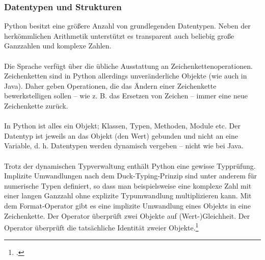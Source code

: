 \subsubsection{Datentypen und Strukturen}
Python besitzt eine größere Anzahl von grundlegenden Datentypen. Neben der herkömmlichen Arithmetik unterstützt es transparent auch beliebig große Ganzzahlen und komplexe Zahlen.\\
\\
Die Sprache verfügt über die übliche Ausstattung an Zeichenkettenoperationen. Zeichenketten sind in Python allerdings unveränderliche Objekte (wie auch in Java). Daher geben Operationen, die das Ändern einer Zeichenkette bewerkstelligen sollen – wie z. B. das Ersetzen von Zeichen – immer eine neue Zeichenkette zurück.\\
\\
In Python ist alles ein Objekt; Klassen, Typen, Methoden, Module etc. Der Datentyp ist jeweils an das Objekt (den Wert) gebunden und nicht an eine Variable, d. h. Datentypen werden dynamisch vergeben – nicht wie bei Java.\\
\\
Trotz der dynamischen Typverwaltung enthält Python eine gewisse Typprüfung. Implizite Umwandlungen nach dem Duck-Typing-Prinzip sind unter anderem für numerische Typen definiert, so dass man beispielsweise eine komplexe Zahl mit einer langen Ganzzahl ohne explizite Typumwandlung multiplizieren kann. Mit dem Format-Operator \displaycode{\%} gibt es eine implizite Umwandlung eines Objekts in eine Zeichenkette. Der Operator \displaycode{==} überprüft zwei Objekte auf (Wert-)Gleichheit. Der Operator  überprüft die tatsächliche Identität zweier Objekte.\footcite{python_wiki}

